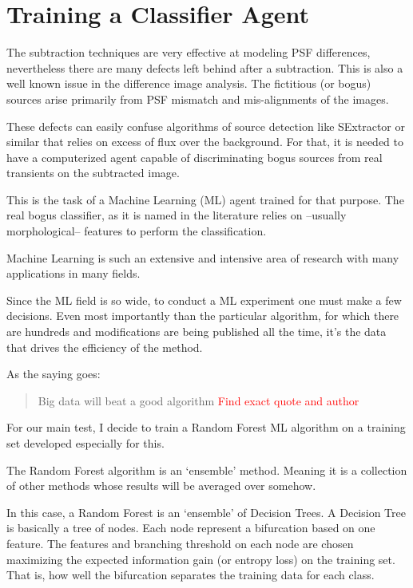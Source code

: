 \chapter{Training a Classifier Agent}

The subtraction techniques are very effective at  modeling PSF differences, nevertheless there are many defects left behind after a subtraction. This is also a well known issue in the difference image analysis. The fictitious (or bogus) sources arise primarily from PSF mismatch and mis-alignments of the images.

These defects can easily confuse algorithms of source detection like SExtractor or similar that relies on excess of flux over the background. For that, it is needed to have a computerized agent capable of discriminating bogus sources from real transients on the subtracted image. 

This is the task of a Machine Learning (ML) agent trained for that purpose. The real bogus classifier, as it is named in the literature relies on --usually morphological-- features to perform the classification.

Machine Learning is such an extensive and intensive area of research with many applications in many fields.

Since the ML field is so wide, to conduct a ML experiment one must make a few decisions. Even most importantly than the particular algorithm, for which there are hundreds and modifications are being published all the time, it's the data that drives the efficiency of the method.

As the saying goes:

\begin{quotation}
Big data will beat a good algorithm \textcolor{red}{Find exact quote and author}
\end{quotation}


For our main test, I decide to train a Random Forest ML algorithm on a training set developed especially for this.

The Random Forest algorithm is an `ensemble' method. Meaning it is a collection of other methods whose results will be averaged over somehow.

In this case, a Random Forest is an `ensemble' of Decision Trees. A Decision Tree is basically a tree of nodes. Each node represent a bifurcation based on one feature. The features and branching threshold on each node are chosen maximizing the expected information gain (or entropy loss) on the training set. That is, how well the bifurcation separates the training data for each class.

